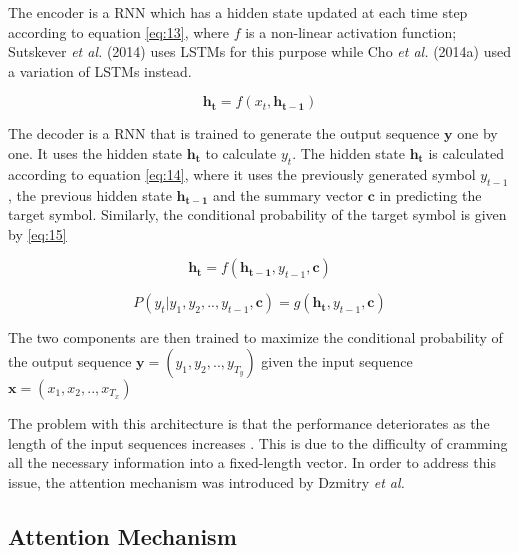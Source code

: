 The encoder is a \ac{RNN} which has a hidden state updated at each time step according to equation \ref{eq:13}, where $f$ is a non-linear activation function;  Sutskever \textit{et al.} (2014) \cite{sutskever2014sequence} uses \ac{LSTM}s for this purpose while Cho \textit{et al.} (2014a) \cite{cho2014learning} used a variation of \ac{LSTM}s instead.

\begin{equation}
\label{eq:13}
\mathbf{h_t} = f( x_t, \mathbf{h_{t-1}})
\end{equation}


The decoder is a \ac{RNN} that is trained to generate the output sequence $ \mathbf{y}$ one by one. It uses the hidden state $ \mathbf{h_t}$ to calculate $ y_t$. The hidden state $ \mathbf{h_t}$ is calculated according to equation \ref{eq:14}, where it uses the previously generated symbol $y_{t-1}$, the previous hidden state $\mathbf{h_{t-1}}$ and the summary vector $\mathbf{c}$ in predicting the target symbol. Similarly, the conditional probability of the target symbol is given by \ref{eq:15}

\begin{equation}
\label{eq:14}
\mathbf{h_t} = f(\mathbf{h_{t-1}}, y_{t-1}, \mathbf{c})
\end{equation}

\begin{equation}
\label{eq:15}
P(y_t | y_1, y_2,.., y_{t-1}, \mathbf{c}) = g(\mathbf{h_{t}}, y_{t-1}, \mathbf{c})
\end{equation}

The two components are then trained to maximize the conditional probability of the output sequence $\mathbf{y}=(y_1,y_2,..,y_{T_y})$ given the input sequence $ \mathbf{x}=(x_1,x_2,..,x_{T_x})$


The problem with this architecture is that the performance deteriorates as the length of the input sequences increases \cite{cho2014properties}. This is due to the difficulty of cramming all the necessary information into a fixed-length vector. In order to address this issue, the attention mechanism was introduced by Dzmitry \textit{et al.} \cite{bahdanau2014neural}


\subsection{Attention Mechanism} 
\label{bg:sub9}

